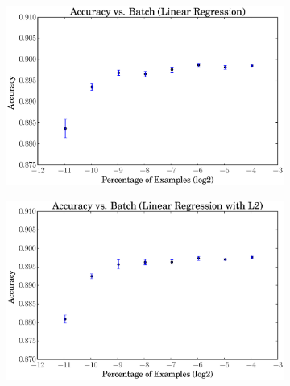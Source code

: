 \documentclass[a4paper, 12pt]{article}
\begin{document}
\begin{figure}[htpb]
    \centering
    \begin{subfigure}[htpb]{0.45\textwidth}
        \includegraphics[width=\textwidth]{acc_vs_batchp_linreg}
        \caption{}
        \label{fig:snt}
    \end{subfigure}
    \begin{subfigure}[htpb]{0.45\textwidth}
        \includegraphics[width=\textwidth]{acc_vs_batchp_linregL2}
        \caption{}
        \label{fig:ret}
    \end{subfigure}
    \hfill %
    \begin{subfigure}[htpb]{0.45\textwidth}

\end{subfigure}
\end{figure}
\end{document}

